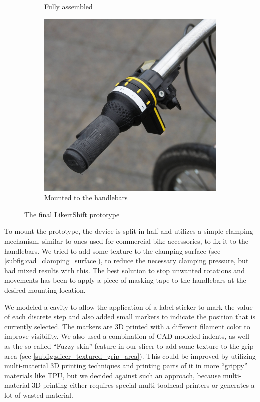 \begin{figure}[!htb]
\begin{subfigure}{.3333\textwidth}
        \caption{Fully assembled}
    \end{subfigure}%
    \begin{subfigure}{.3333\textwidth}
        \centering
        \includegraphics[width=.9\linewidth]{images/likertshift_mounted.jpg}
        \caption{Mounted to the handlebars}
        \label{subfig:likertshift_mounted}
    \end{subfigure}
    \caption{The final LikertShift prototype}
    \label{fig:likertshift}
\end{figure}

\noindent
To mount the prototype, the device is split in half and utilizes a simple clamping mechanism, similar to ones used for commercial bike accessories, to fix it to the handlebars.
We tried to add some texture to the clamping surface (see \autoref{subfig:cad_clamping_surface}), to reduce the necessary clamping pressure, but had mixed results with this.
The best solution to stop unwanted rotations and movements has been to apply a piece of masking tape to the handlebars at the desired mounting location.

We modeled a cavity to allow the application of a label sticker to mark the value of each discrete step and also added small markers to indicate the position that is currently selected.
The markers are 3D printed with a different filament color to improve visibility.
We also used a combination of CAD modeled indents, as well as the so-called “Fuzzy skin” feature in our slicer to add some texture to the grip area (see \autoref{subfig:slicer_textured_grip_area}).
This could be improved by utilizing multi-material 3D printing techniques and printing parts of it in more “grippy” materials like TPU, but we decided against such an approach, because multi-material 3D printing either requires special multi-toolhead printers or generates a lot of wasted material.

